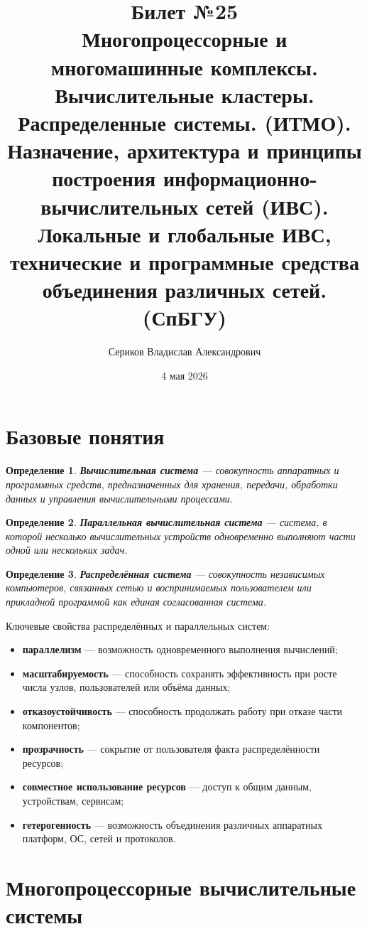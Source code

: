 \documentclass[12pt,a4paper]{article}
\title{Билет №25 \\ \small Многопроцессорные и многомашинные комплексы. Вычислительные кластеры. Распределенные системы. (ИТМО). \\ Назначение, архитектура и принципы построения информационно-вычислительных сетей (ИВС). Локальные и глобальные ИВС, технические и программные средства объединения различных сетей. (СпБГУ)}
\author{Сериков Владислав Александрович}
\date{4 мая 2026}
\newtheorem{definition}{Определение}
\begin{document}
\maketitle
\tableofcontents
\newpage

\section{Базовые понятия}

\begin{definition}
\textbf{Вычислительная система} --- совокупность аппаратных и программных средств, предназначенных для хранения, передачи, обработки данных и управления вычислительными процессами.
\end{definition}

\begin{definition}
\textbf{Параллельная вычислительная система} --- система, в которой несколько вычислительных устройств одновременно выполняют части одной или нескольких задач.
\end{definition}

\begin{definition}
\textbf{Распределённая система} --- совокупность независимых компьютеров, связанных сетью и воспринимаемых пользователем или прикладной программой как единая согласованная система.
\end{definition}

Ключевые свойства распределённых и параллельных систем:
\begin{itemize}
    \item \textbf{параллелизм} --- возможность одновременного выполнения вычислений;
    \item \textbf{масштабируемость} --- способность сохранять эффективность при росте числа узлов, пользователей или объёма данных;
    \item \textbf{отказоустойчивость} --- способность продолжать работу при отказе части компонентов;
    \item \textbf{прозрачность} --- сокрытие от пользователя факта распределённости ресурсов;
    \item \textbf{совместное использование ресурсов} --- доступ к общим данным, устройствам, сервисам;
    \item \textbf{гетерогенность} --- возможность объединения различных аппаратных платформ, ОС, сетей и протоколов.
\end{itemize}

\section{Многопроцессорные вычислительные системы}
\end{document}
